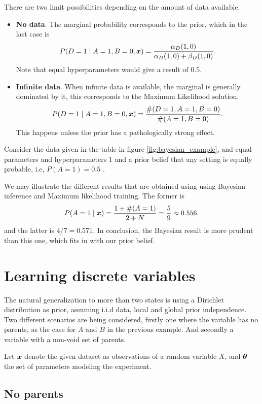 There are two limit possibilities depending on the amount of data available.
\begin{itemize}
  \item \textbf{No data}. The marginal probability corresponds to the prior, which
in the last case is
    \[
    P(D = 1 \mid A = 1, B = 0, \bm{x}) = \frac{\alpha_{D}(1,0)}{\alpha_{D}(1,0) + \beta_{D}(1,0)}.
    \]
    Note that equal hyperparameters would give a result of \(0.5\).\newline
   
  \item \textbf{Infinite data}. When infinite data is available, the marginal is generally dominated by it,
    this corresponds to the Maximum Likelihood solution.
    \[
    P(D = 1 \mid A = 1, B = 0, \bm{x}) = \frac{\#(D = 1, A = 1 , B = 0)}{\#(A = 1, B = 0)}.
    \]
    This happens unless the prior has a pathologically strong effect.
\end{itemize}

 Consider the data given in the table in figure \ref{fig:bayesian_example}, and
 equal parameters and hyperparameters \(1\) and a prior belief that any setting is equally probable, i.e, \( P(A=1) = 0.5\) . 
 
 We may illustrate the different results that are obtained using using Bayesian inference and Maximum likelihood training. The former is
 \[
   P(A = 1 \mid \bm{x}) = \frac{1 + \#(A = 1)}{2 + N} = \frac{5}{9} \approx 0.556.
 \]
 and the latter is \(4/7 = 0.571\). In conclusion, the Bayesian
 result is more prudent than this one, which fits in with our prior belief.

 \section{Learning discrete variables}

 The natural generalization to more than two states is using a Dirichlet
 distribution as prior, assuming i.i.d data, local and global prior
 independence. Two different scenarios are being considered, firstly one where the
 variable has no parents, as the case for \(A\) and \(B\) in the previous
 example. And secondly a variable with a non-void set of parents.

 Let \(\bm{x}\) denote the given dataset as observations of a random variable \(X\), and \(\bm{\theta}\) the set of parameters modeling the experiment.

 \subsection{No parents}\label{subsec:no_parents}

